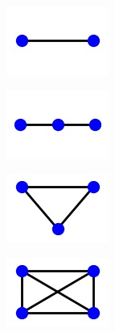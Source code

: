 \begin{figure}
\begin{center}
    \begin{subfigure}{2.25cm}
        \begin{center}
            \includegraphics{theoretical_study/figures/lattices/_2_site_chain.jpg}                        
        \end{center}
        \caption{}
    \end{subfigure}
    \qquad
    \begin{subfigure}{2.25cm} 
        \begin{center}
            \includegraphics{theoretical_study/figures/lattices/_3_site_chain.jpg}
        \end{center}
        \caption{}
    \end{subfigure}
    \qquad
    \begin{subfigure}{2.25cm} 
        \begin{center}
            \includegraphics{theoretical_study/figures/lattices/_3_site_lattice_fully_connected.jpg}        
        \end{center}
        \caption{}
    \end{subfigure}
    \qquad
    \begin{subfigure}{2.25cm} 
        \begin{center}
            \includegraphics{theoretical_study/figures/lattices/_4_site_lattice_fully_connected.jpg}        
        \end{center}

\end{subfigure}
\end{center}
\end{figure}
